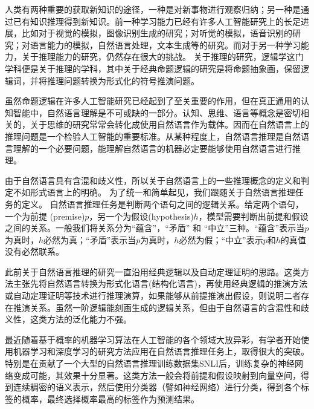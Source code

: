 \documentclass[UTF8,11pt,a4paper,nofonts]{ctexart}
\begin{document}
人类有两种重要的获取新知识的途径，一种是对新事物进行观察归纳；另一种是通过已有知识推理得到新知识。前一种学习能力已经有许多人工智能研究上的长足进展，比如对于视觉的模拟，图像识别生成的研究\cite{He2016DeepRL}；对听觉的模拟，语音识别的研究\cite{Chan2016ListenAA}；对语言能力的模拟，自然语言处理，文本生成等的研究\cite{Bahdanau2014NeuralMT, Vinyals2015ANC}。而对于另一种学习能力，关于推理能力的研究，仍然存在很大的挑战。
关于推理的研究，逻辑学这门学科便是关于推理的学科，其中关于经典命题逻辑的研究是将命题抽象画，保留逻辑词，并将推理问题转换为形式化的符号推演问题。

虽然命题逻辑在许多人工智能研究已经起到了至关重要的作用，但在真正通用的认知智能中，自然语言理解是不可或缺的一部分。认知、思维、语言等概念是密切相关的，关于思维的研究常常会转化成使用自然语言作为载体。因而在自然语言上的推理问题是一个检验人工智能的重要标准。从某种程度上，自然语言推理是自然语言理解的一个必要问题，能理解自然语言的机器必定要能够使用自然语言进行推理。

由于自然语言具有含混和歧义性，所以关于自然语言上的一些推理概念的定义和判定不如形式语言上的明确\cite{Marneffe2008FindingCI, Marelli2014ASC}。
为了统一和简单起见，我们跟随\cite{Nangia2017TheR2, Bowman2015ALA}关于自然语言推理任务的定义。
自然语言推理任务是判断两个语句之间的逻辑关系。给定两个语句，一个为前提 (premise)$p$，另一个为假设(hypothesis)$h$，模型需要判断出前提和假设之间的关系。一般我们将关系分为“蕴含”，“矛盾” 和 “中立”三种。“蕴含”表示当$p$为真时，$h$必然为真；“矛盾”表示当$p$为真时，$h$必然为假；“中立”表示$p$和$h$的真值没有必然联系。






此前关于自然语言推理的研究一直沿用经典逻辑以及自动定理证明的思路。这类方法主张先将自然语言转换为形式化语言(结构化语言)，再使用经典逻辑的推演方法或自动定理证明等技术进行推理演算，如果能够从前提推演出假设，则说明二者存在推演关系。虽然一阶逻辑能刻画生成的逻辑关系，但由于自然语言的含混性和歧义性，这类方法的泛化能力不强。

最近随着基于概率的机器学习算法在人工智能的各个领域大放异彩，有学者开始使用机器学习和深度学习的研究方法应用在自然语言推理任务上，取得很大的突破。特别是在\cite{Bowman2015ALA}贡献了一个大型的自然语言推理训练数据集SNLI后，训练复杂的神经网络变成可能，其效果十分显著。这类方法一般会将前提和假设映射到向量空间，得到连续稠密的语义表示，然后使用分类器（譬如神经网络）进行分类，得到各个标签的概率，最终选择概率最高的标签作为预测结果。
\end{document}
